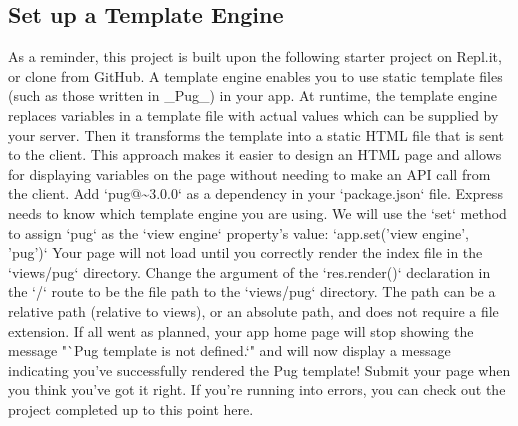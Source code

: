 \documentclass{article}%
\begin{document}
\subsection{Set up a Template Engine}%
\label{subsec:SetupaTemplateEngine}%
As a reminder, this project is built upon the following starter project on Repl.it, or clone from GitHub.\newline%
A template engine enables you to use static template files (such as those written in \_Pug\_) in your app. At runtime, the template engine replaces variables in a template file with actual values which can be supplied by your server. Then it transforms the template into a static HTML file that is sent to the client. This approach makes it easier to design an HTML page and allows for displaying variables on the page without needing to make an API call from the client.\newline%
Add `pug@\textasciitilde{}3.0.0` as a dependency in your `package.json` file.\newline%
Express needs to know which template engine you are using. We will use the `set` method to assign `pug` as the `view engine` property's value: `app.set('view engine', 'pug')`\newline%
Your page will not load until you correctly render the index file in the `views/pug` directory.\newline%
Change the argument of the `res.render()` declaration in the `/` route to be the file path to the `views/pug` directory. The path can be a relative path (relative to views), or an absolute path, and does not require a file extension.\newline%
If all went as planned, your app home page will stop showing the message "`Pug template is not defined.`" and will now display a message indicating you've successfully rendered the Pug template!\newline%
Submit your page when you think you've got it right. If you're running into errors, you can check out the project completed up to this point here.\newline%

%
\end{document}
